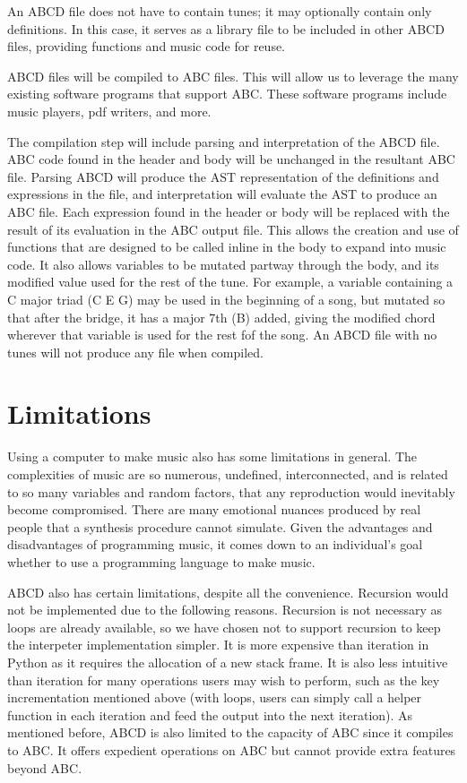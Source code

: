An ABCD file does not have to contain tunes; it may optionally contain only definitions. In this case, it serves as a library file to be included in other ABCD files, providing functions and music code for reuse.
    
ABCD files will be compiled to ABC files. This will allow us to leverage the many existing software programs that support ABC\cite{Walshaw17}. These software programs include music players, pdf writers, and more.

The compilation step will include parsing and interpretation of the ABCD file. ABC code found in the header and body will be unchanged in the resultant ABC file. Parsing ABCD will produce the AST representation of the definitions and expressions in the file, and interpretation will evaluate the AST to produce an ABC file. Each expression found in the header or body will be replaced with the result of its evaluation in the ABC output file. This allows the creation and use of functions that are designed to be called inline in the body to expand into music code. It also allows variables to be mutated partway through the body, and its modified value used for the rest of the tune. For example, a variable containing a C major triad (C E G) may be used in the beginning of a song, but mutated so that after the bridge, it has a major 7th (B) added, giving the modified chord wherever that variable is used for the rest fof the song. An ABCD file with no tunes will not produce any file when compiled.

\section{Limitations}
Using a computer to make music also has some limitations in general. The complexities of music are so numerous, undefined, interconnected, and is related to so many variables and random factors, that any reproduction would inevitably become compromised. There are many emotional nuances produced by real people that a synthesis procedure cannot simulate\cite{Dobrian88}.  Given the advantages and disadvantages of programming music, it comes down to an individual's goal whether to use a programming language to make music. 

ABCD also has certain limitations, despite all the convenience. Recursion would not be implemented due to the following reasons. Recursion is not necessary as loops are already available, so we have chosen not to support recursion to keep the interpeter implementation simpler. It is more expensive than iteration in Python as it requires the allocation of a new stack frame.  It is also less intuitive than iteration for many operations users may wish to perform, such as the key incrementation mentioned above (with loops, users can simply call a helper function in each iteration and feed the output into the next iteration). As mentioned before, ABCD is also limited to the capacity of ABC since it compiles to ABC. It offers expedient operations on ABC but cannot provide extra features beyond ABC.

